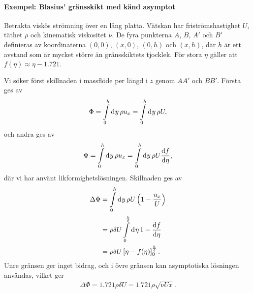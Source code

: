 \paragraph{Exempel: Blasius' gränsskikt med känd asymptot}
Betrakta viskös strömning över en lång platta. Vätskan har friströmshastighet $U$, täthet $\rho$ och kinematisk viskositet $\nu$. De fyra punkterna $A$, $B$, $A'$ och $B'$ definieras av koordinaterna $(0, 0)$, $(x, 0)$, $(0, h)$ och $(x, h)$, där $h$ är ett avstand som är mycket större än gränsskiktets tjocklek. För stora $\eta$ gäller att $f(\eta) \approx \eta - 1.721$.

Vi söker först skillnaden i massflöde per längd i $z$ genom $AA'$ och $BB'$. Första ges av
\begin{align*}
	\Phi = \int\limits_{0}^{h}\dd[]{y}\rho u_{x} = \int\limits_{0}^{h}\dd[]{y}\rho U,
\end{align*}
och andra ges av
\begin{align*}
	\Phi = \int\limits_{0}^{h}\dd[]{y}\rho u_{x} = \int\limits_{0}^{h}\dd[]{y}\rho U\dv{f}{\eta},
\end{align*}
där vi har använt likformighetslösningen. Skillnaden ges av
\begin{align*}
	\Delta\Phi &= \int\limits_{0}^{h}\dd[]{y}\rho U\left(1 - \frac{u_{x}}{U}\right) \\
	           &= \rho\delta U\int\limits_{0}^{\frac{h}{\delta}}\dd[]{\eta}1 - \dv{f}{\eta} \\
	           &= \rho\delta U\left[\eta - f(\eta)\right]_{0}^{\frac{h}{\delta}}.
\end{align*}
Unre gränsen ger inget bidrag, och i övre gränsen kan asymptotiska lösningen användas, vilket ger
\begin{align*}
	\Delta\Phi = 1.721\rho\delta U = 1.721\rho\sqrt{\nu Ux}.
\end{align*}

